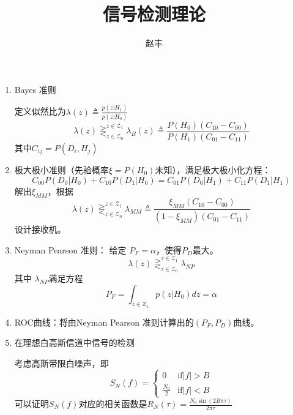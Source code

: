 \documentclass{article}
\begin{document}
\title{信号检测理论}
\author{赵丰}
\maketitle
\begin{enumerate}
\item Bayes 准则

定义似然比为$\lambda(z) \triangleq \frac{p(z|H_1)}{p(z|H_0)}$
\begin{equation}
\lambda(z)\mathop{\gtreqless}_{z\in \mathcal{Z}_0}^{z\in \mathcal{Z}_1} \lambda_B(z)\triangleq \frac{P(H_0)(C_{10}-C_{00})}{P(H_1)(C_{01}-C_{11})}
\end{equation}
其中$C_{ij}=P(D_i,H_j)$

\item 极大极小准则（先验概率$\xi=P(H_0)$未知），满足极大极小化方程：
\begin{equation}
C_{00}P(D_0|H_0)+C_{10}P(D_1|H_0)=C_{01}P(D_0|H_1)+C_{11}P(D_1|H_1)
\end{equation}
解出$\xi_{MM}$，根据
\begin{equation}
\lambda(z)\mathop{\gtreqless}^{z\in \mathcal{Z}_1}_{z \in \mathcal{Z}_0} \lambda_{MM} \triangleq \frac{\xi_{MM}(C_{10}-C_{00})}{(1-\xi_{MM})(C_{01}-C_{11})}
\end{equation}
设计接收机。
\item Neyman Pearson 准则：
给定 $P_F=\alpha$，使得$P_D$最大。
\begin{equation}
\lambda(z)\mathop{\gtreqless}^{z\in \mathcal{Z}_1}_{z \in \mathcal{Z}_0} 
\lambda_{NP}
\end{equation}
其中 $\lambda_{NP}$满足方程
\begin{equation}
P_F=\int_{z\in Z_1}p(z|H_0)dz=\alpha
\end{equation}

\item ROC曲线：将由Neyman Pearson 准则计算出的$(P_F,P_D)$曲线。

\item 在理想白高斯信道中信号的检测

考虑高斯带限白噪声，即
\begin{equation}
S_N(f)=\begin{cases}
0 & \textrm{if} |f|>B\\
\frac{N_0}{2} & \textrm{if} |f|<B
\end{cases}
\end{equation}
可以证明$S_N(f)$对应的相关函数是$R_N(\tau)=\frac{N_0\sin(2B\pi \tau)}{2\pi \tau}$


\end{enumerate}
\end{document}
